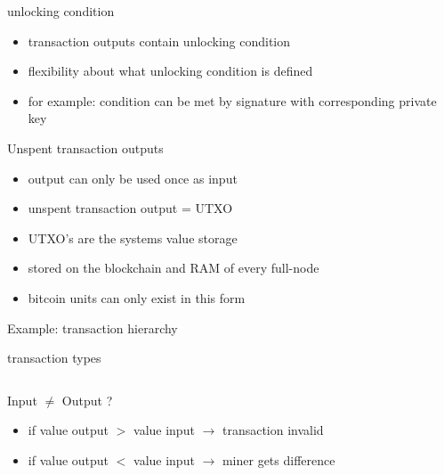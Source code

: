 \documentclass[]{beamer}
\begin{document}
\begin{frame}{unlocking condition}
\begin{itemize}
    \item<1->{transaction outputs contain unlocking condition}
    \item<2->{flexibility about what unlocking condition is defined}
    \item<3->{for example: condition can be met by signature with corresponding private key}
\end{itemize}
\end{frame}        


\begin{frame}{Unspent transaction outputs}
\begin{itemize}
    \item<1->{output can only be used once as input}
    \item<2->{unspent transaction output = UTXO}
    \item<3->{UTXO's are the systems value storage}
    \item<4->{stored on the blockchain and RAM of every full-node}
    \item<5->{bitcoin units can only exist in this form}
\end{itemize}    
\end{frame}


\begin{frame}{Example: transaction hierarchy}
\resizebox{10.7cm}{7cm}{

}
\end{frame}


\begin{frame}{transaction types}
\begin{columns}

\vspace{1cm}
 
\vspace{0.4cm}



\vspace{0.5cm}


\end{columns}
\end{frame}


\begin{frame}{Input $\neq$ Output ?}
\begin{itemize}
    \item<1->{if value output $>$ value input $\rightarrow$ transaction invalid}
    \item<2->{if value output $<$ value input $\rightarrow$ miner gets difference}
    \end{itemize} 
    \vspace{2em}
\begin{center}
\end{center}  
\end{frame}
\end{document}
